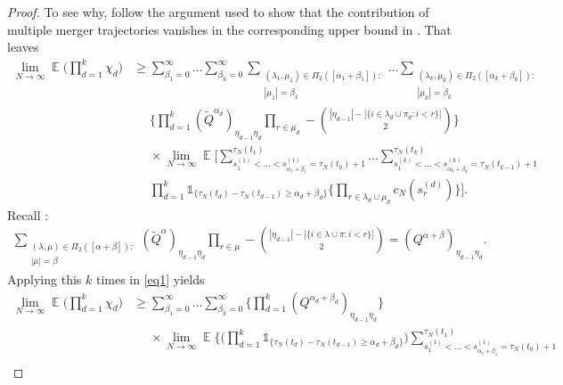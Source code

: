 \documentclass{article}
\theoremstyle{definition}
\DeclareMathOperator{\E}{\mathbb{E}}
\newcommand{\1}[1]{\mathbbm{1}_{\{#1\}}}
\begin{document}
\begin{proof}
To see why, follow the argument used to show that the contribution of multiple merger trajectories vanishes in the corresponding upper bound in \citet{koskela2018}.
That leaves
\begin{align}
\lim_{ N \rightarrow \infty } \E\Bigg( \prod_{ d = 1 }^k \chi_d \Bigg) 
&\geq \sum_{ \beta_1 = 0 }^{ \infty } \ldots \sum_{ \beta_k = 0 }^{ \infty } \sum_{\substack{ ( \lambda_1, \mu_1 ) \in \Pi_2( [ \alpha_1 + \beta_1 ] ) :\\ | \mu_1 | = \beta_1 }} \ldots \sum_{\substack{ ( \lambda_k, \mu_k ) \in \Pi_2( [ \alpha_k + \beta_k ] ) :\\ | \mu_k | = \beta_k }} \nonumber \\
&\phantom{\geq} \Bigg\{ \prod_{ d = 1 }^k ( \tilde{ Q }^{ \alpha_d } )_{ \eta_{ d - 1 } \eta_d } \prod_{ r \in \mu_d } - \binom{ | \eta_{ d - 1 } | - | \{ i \in \lambda_d \cup \pi_d : i < r \} | }{ 2 } \Bigg\} \nonumber \\
&\phantom{\geq} \times \lim_{ N \rightarrow \infty } \E\Bigg[ \sum_{ s_1^{ ( 1 ) } < \ldots < s_{ \alpha_1 + \beta_1 }^{ ( 1 ) } = \tau_N( t_0 ) + 1 }^{ \tau_N( t_1 ) } \ldots \sum_{ s_1^{ ( k ) } < \ldots < s_{ \alpha_k + \beta_k }^{ ( k ) } = \tau_N( t_{ k - 1 } ) + 1 }^{ \tau_N( t_k ) } \nonumber \\
&\phantom{\geq} \prod_{ d = 1 }^k \mathds{ 1 }_{ \{ \tau_N( t_d ) - \tau_N( t_{ d - 1 } ) \geq \alpha_d + \beta_d \} } \Bigg\{ \prod_{ r \in \lambda_d \cup \mu_d } c_N( s_r^{ ( d ) } ) \Bigg\} \Bigg]. \label{eq1}
\end{align}
Recall \citep[Eq (11)]{koskela2018}:
\begin{align*}
\sum_{\substack{ ( \lambda, \mu ) \in \Pi_2( [ \alpha + \beta ] ) :\\ | \mu | = \beta }} ( \tilde{ Q }^{ \alpha } )_{ \eta_{ d - 1 } \eta_d } \prod_{ r \in \mu } - \binom{ | \eta_{ d - 1 } | - | \{ i \in \lambda \cup \pi : i < r \} | }{ 2 } = ( Q^{ \alpha + \beta } )_{ \eta_{ d - 1 } \eta_d } .
\end{align*}
Applying this $k$ times in \eqref{eq1} yields
\begin{align*}
\lim_{ N \rightarrow \infty } \E\Bigg( \prod_{ d = 1 }^k \chi_d \Bigg) 
&\geq \sum_{ \beta_1 = 0 }^{ \infty } \ldots \sum_{ \beta_k = 0 }^{ \infty } \Bigg\{ \prod_{ d = 1 }^k ( Q^{ \alpha_d + \beta_d } )_{ \eta_{ d - 1 } \eta_d } \Bigg\} \\
&\phantom{\geq} \times \lim_{ N \rightarrow \infty } \E\Bigg\{ \Bigg( \prod_{ d = 1 }^k \mathds{ 1 }_{ \{ \tau_N( t_d ) - \tau_N( t_{ d - 1 } ) \geq \alpha_d + \beta_d \} } \Bigg) \sum_{ s_1^{ ( 1 ) } < \ldots < s_{ \alpha_1 + \beta_1 }^{ ( 1 ) } = \tau_N( t_0 ) + 1 }^{ \tau_N( t_1 ) } \\

\end{align*}
\end{proof}
\end{document}
